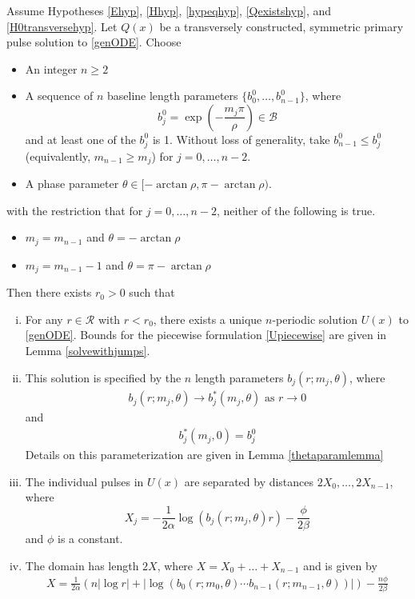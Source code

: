 \documentclass[thesis.tex]{subfiles}
\begin{document}
\begin{theorem}\label{perexist}
Assume Hypotheses \ref{Ehyp}, \ref{Hhyp}, \ref{hypeqhyp}, \ref{Qexistshyp}, and \ref{H0transversehyp}. Let $Q(x)$ be a transversely constructed, symmetric primary pulse solution to \eqref{genODE}. Choose
\begin{itemize}
\item An integer $n \geq 2$ 
\item A sequence of $n$ baseline length parameters $\{ b_0^0, \dots, b_{n-1}^0 \}$, where 
\[
b_j^0 = \exp\left(-\frac{m_j \pi}{\rho}\right) \in \mathcal{B}
\]
and at least one of the $b_j^0$ is 1. Without loss of generality, take $b_{n-1}^0 \leq b_j^0$ (equivalently, $m_{n-1} \geq m_j$) for $j = 0, \dots, n-2$.
\item A phase parameter $\theta \in [-\arctan \rho, \pi - \arctan \rho)$.
\end{itemize}
with the restriction that for $j = 0, \dots, n-2$, neither of the following is true.
\begin{itemize}
\item $m_j = m_{n-1}$ and $\theta = -\arctan \rho$
\item $m_j = m_{n-1} - 1$ and $\theta = \pi-\arctan \rho$
\end{itemize}
Then there exists $r_0 > 0$ such that
\begin{enumerate}[(i)]

\item For any $r \in \mathcal{R}$ with $r < r_0$, there exists a unique $n$-periodic solution $U(x)$ to \eqref{genODE}. Bounds for the piecewise formulation \eqref{Upiecewise} are given in Lemma \ref{solvewithjumps}.

\item This solution is specified by the $n$ length parameters $b_j(r; m_j, \theta)$, where
\begin{align}
b_j(r; m_j, \theta) \rightarrow b^*_j(m_j, \theta) \text{ as } r \rightarrow 0
\end{align}
and
\begin{align}
b^*_j(m_j, 0) = b_j^0
\end{align}
Details on this parameterization are given in Lemma \ref{thetaparamlemma}

\item The individual pulses in $U(x)$ are separated by distances $2 X_0, \dots, 2 X_{n-1}$, where 
\begin{equation}\label{Xj}
X_j = -\frac{1}{2\alpha}\log(b_j(r; m_j, \theta) r) - \frac{\phi}{2 \beta} 
\end{equation}
and $\phi$ is a constant.

\item The domain has length $2X$, where $X = X_0 + \dots + X_{n-1}$ and is given by
\begin{align}
X = \frac{1}{2\alpha} \left(n |\log r| + |\log(b_0(r; m_0, \theta) \cdots b_{n-1}(r; m_{n-1}, \theta))| \right) - \frac{n \phi}{2 \beta}
\end{align}

\end{enumerate}
\end{theorem}
\end{document}
